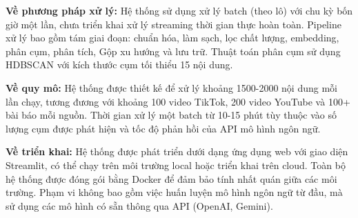 \textbf{Về phương pháp xử lý:} Hệ thống sử dụng xử lý batch (theo lô) với chu kỳ bốn giờ một lần, chưa triển khai xử lý streaming thời gian thực hoàn toàn. Pipeline xử lý bao gồm tám giai đoạn: chuẩn hóa, làm sạch, lọc chất lượng, embedding, phân cụm, phân tích, Gộp xu hướng và lưu trữ. Thuật toán phân cụm sử dụng HDBSCAN với kích thước cụm tối thiểu 15 nội dung.

\textbf{Về quy mô:} Hệ thống được thiết kế để xử lý khoảng 1500-2000 nội dung mỗi lần chạy, tương đương với khoảng 100 video TikTok, 200 video YouTube và 100+ bài báo mỗi nguồn. Thời gian xử lý một batch từ 10-15 phút tùy thuộc vào số lượng cụm được phát hiện và tốc độ phản hồi của API mô hình ngôn ngữ.

\textbf{Về triển khai:} Hệ thống được phát triển dưới dạng ứng dụng web với giao diện Streamlit, có thể chạy trên môi trường local hoặc triển khai trên cloud. Toàn bộ hệ thống được đóng gói bằng Docker để đảm bảo tính nhất quán giữa các môi trường. Phạm vi không bao gồm việc huấn luyện mô hình ngôn ngữ từ đầu, mà sử dụng các mô hình có sẵn thông qua API (OpenAI, Gemini).
